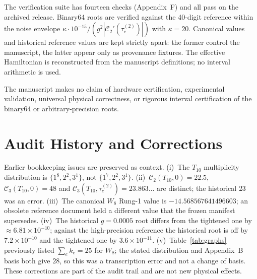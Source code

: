 \documentclass[10pt,twocolumn]{article}
\theoremstyle{definition}
\newcommand{\Tten}{T_{10}}
\newcommand{\tauc}{\tau_c^{(2)}}
\begin{document}
The verification suite has fourteen checks (Appendix~F) and all pass on the archived release. Binary64 roots are verified against the 40-digit reference within the noise envelope $\kappa\cdot10^{-15}/(g^2|\mathcal C_2'(\tauc)|)$ with $\kappa=20$. Canonical values and historical reference values are kept strictly apart: the former control the manuscript, the latter appear only as provenance fixtures. The effective Hamiltonian is reconstructed from the manuscript definitions; no interval arithmetic is used.

The manuscript makes no claim of hardware certification, experimental validation, universal physical correctness, or rigorous interval certification of the binary64 or arbitrary-precision roots.

\section{Audit History and Corrections}
Earlier bookkeeping issues are preserved as context. (i)~The $\Tten$ multiplicity distribution is $\{1^8,2^2,3^1\}$, not $\{1^7,2^2,3^1\}$. (ii)~$\mathcal C_2(\Tten,0)=22.5$, $\mathcal C_3(\Tten,0)=48$ and $\mathcal C_3(\Tten,\tauc)=23.863\ldots$ are distinct; the historical $23$ was an error. (iii)~The canonical $W_8$ Rung-1 value is $-14.568567641496603$; an obsolete reference document held a different value that the frozen manifest supersedes. (iv)~The historical $g=0.0005$ root differs from the tightened one by $\approx6.81\times10^{-10}$; against the high-precision reference the historical root is off by $7.2\times10^{-10}$ and the tightened one by $3.6\times10^{-11}$. (v)~Table~\ref{tab:graphs} previously listed $\sum_ek_e=25$ for $W_8$; the stated distribution and Appendix~B basis both give $28$, so this was a transcription error and not a change of basis. These corrections are part of the audit trail and are not new physical effects.

\end{document}
